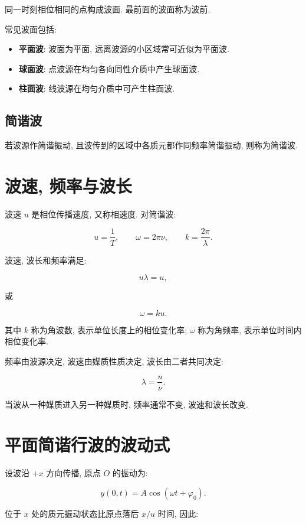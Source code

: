 \documentclass[
  a4paper,
]{ctexrep}
\providecommand{\tightlist}{%
  \setlength{\itemsep}{0pt}\setlength{\parskip}{0pt}}
\begin{document}
同一时刻相位相同的点构成波面. 最前面的波面称为波前.

常见波面包括:

\begin{itemize}
\tightlist
\item
  \textbf{平面波}: 波面为平面, 远离波源的小区域常可近似为平面波.
\item
  \textbf{球面波}: 点波源在均匀各向同性介质中产生球面波.
\item
  \textbf{柱面波}: 线波源在均匀介质中可产生柱面波.
\end{itemize}

\subsection{简谐波}\label{ux7b80ux8c10ux6ce2}

若波源作简谐振动, 且波传到的区域中各质元都作同频率简谐振动,
则称为简谐波.

\section{波速,
频率与波长}\label{ux6ce2ux901f-ux9891ux7387ux4e0eux6ce2ux957f}

波速 \(u\) 是相位传播速度, 又称相速度. 对简谐波:

\[
u=\frac{1}{T},\qquad \omega=2\pi\nu,\qquad k=\frac{2\pi}{\lambda}.
\]

波速, 波长和频率满足:

\[
u\lambda=u,
\]

或

\[
\omega=ku.
\]

其中 \(k\) 称为角波数, 表示单位长度上的相位变化率; \(\omega\)
称为角频率, 表示单位时间内相位变化率.

频率由波源决定, 波速由媒质性质决定, 波长由二者共同决定:

\[
\lambda=\frac{u}{\nu}.
\]

当波从一种媒质进入另一种媒质时, 频率通常不变, 波速和波长改变.

\section{平面简谐行波的波动式}\label{ux5e73ux9762ux7b80ux8c10ux884cux6ce2ux7684ux6ce2ux52a8ux5f0f}

设波沿 \(+x\) 方向传播, 原点 \(O\) 的振动为:

\[
y(0,t)=A\cos(\omega t+\varphi_0).
\]

位于 \(x\) 处的质元振动状态比原点落后 \(x/u\) 时间, 因此:
\end{document}
